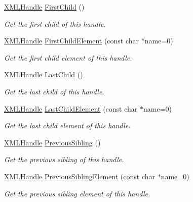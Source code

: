 \begin{DoxyCompactItemize}
\mbox{\hyperlink{classtinyxml2_1_1_x_m_l_handle}{X\+M\+L\+Handle}} \mbox{\hyperlink{classtinyxml2_1_1_x_m_l_handle_a536447dc7f54c0cd11e031dad94795ae}{First\+Child}} ()
\begin{DoxyCompactList}\small\item\em Get the first child of this handle. \end{DoxyCompactList}\item 
\mbox{\hyperlink{classtinyxml2_1_1_x_m_l_handle}{X\+M\+L\+Handle}} \mbox{\hyperlink{classtinyxml2_1_1_x_m_l_handle_a74b04dd0f15e0bf01860e282b840b6a3}{First\+Child\+Element}} (const char $\ast$name=0)
\begin{DoxyCompactList}\small\item\em Get the first child element of this handle. \end{DoxyCompactList}\item 
\mbox{\hyperlink{classtinyxml2_1_1_x_m_l_handle}{X\+M\+L\+Handle}} \mbox{\hyperlink{classtinyxml2_1_1_x_m_l_handle_a9d09f04435f0f2f7d0816b0198d0517b}{Last\+Child}} ()
\begin{DoxyCompactList}\small\item\em Get the last child of this handle. \end{DoxyCompactList}\item 
\mbox{\hyperlink{classtinyxml2_1_1_x_m_l_handle}{X\+M\+L\+Handle}} \mbox{\hyperlink{classtinyxml2_1_1_x_m_l_handle_a42cccd0ce8b1ce704f431025e9f19e0c}{Last\+Child\+Element}} (const char $\ast$name=0)
\begin{DoxyCompactList}\small\item\em Get the last child element of this handle. \end{DoxyCompactList}\item 
\mbox{\hyperlink{classtinyxml2_1_1_x_m_l_handle}{X\+M\+L\+Handle}} \mbox{\hyperlink{classtinyxml2_1_1_x_m_l_handle_a428374e756f4db4cbc287fec64eae02c}{Previous\+Sibling}} ()
\begin{DoxyCompactList}\small\item\em Get the previous sibling of this handle. \end{DoxyCompactList}\item 
\mbox{\hyperlink{classtinyxml2_1_1_x_m_l_handle}{X\+M\+L\+Handle}} \mbox{\hyperlink{classtinyxml2_1_1_x_m_l_handle_a786957e498039554ed334cdc36612a7e}{Previous\+Sibling\+Element}} (const char $\ast$name=0)
\begin{DoxyCompactList}\small\item\em Get the previous sibling element of this handle. \end{DoxyCompactList}\item 

\end{DoxyCompactItemize}
